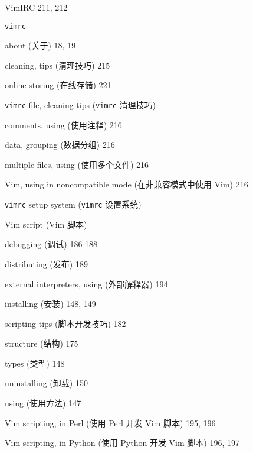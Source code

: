 \begin{multicols}{2}
\hangindent=2pc  VimIRC 211, 212

\hangindent=2pc  \texttt{vimrc} \par
\hangindent=2pc \quad about (关于) 18, 19 \par
\hangindent=2pc \quad cleaning, tips (清理技巧) 215 \par
\hangindent=2pc \quad online storing (在线存储) 221 \par

\hangindent=2pc  \texttt{vimrc} file, cleaning tips (\texttt{vimrc} 清理技巧) \par
\hangindent=2pc \quad comments, using (使用注释) 216 \par
\hangindent=2pc \quad data, grouping (数据分组) 216 \par
\hangindent=2pc \quad multiple files, using (使用多个文件) 216 \par
\hangindent=2pc \quad Vim, using in noncompatible mode (在非兼容模式中使用 Vim) 216 \par

\hangindent=2pc  \texttt{vimrc} setup system (\texttt{vimrc} 设置系统) \par

\hangindent=2pc  Vim script (Vim 脚本) \par
\hangindent=2pc \quad debugging (调试) 186-188 \par
\hangindent=2pc \quad distributing (发布) 189 \par
\hangindent=2pc \quad external interpreters, using (外部解释器) 194 \par
\hangindent=2pc \quad installing (安装) 148, 149 \par
\hangindent=2pc \quad scripting tips (脚本开发技巧) 182 \par
\hangindent=2pc \quad structure (结构) 175 \par
\hangindent=2pc \quad types (类型) 148 \par
\hangindent=2pc \quad uninstalling (卸载) 150 \par
\hangindent=2pc \quad using (使用方法) 147 \par

\hangindent=2pc  Vim scripting, in Perl (使用 Perl 开发 Vim 脚本) 195, 196

\hangindent=2pc  Vim scripting, in Python (使用 Python 开发 Vim 脚本) 196, 197


\end{multicols}

